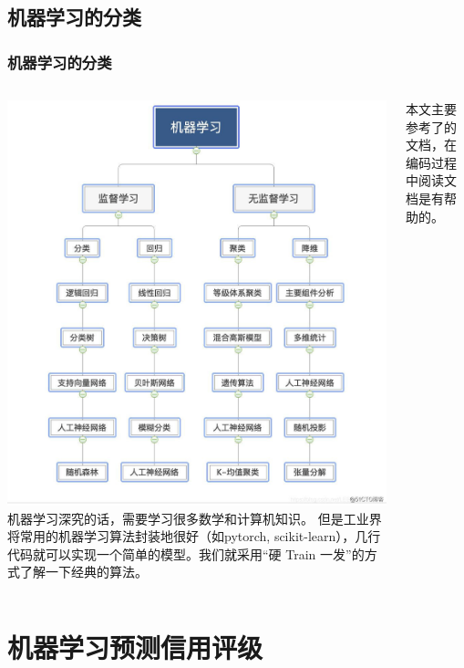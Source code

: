 \subsection{机器学习的分类}
\begin{frame}
    \frametitle{机器学习的分类}
    \begin{columns}
        \includegraphics[width=.9\textwidth]{../lib/机器学习.jpeg}
        机器学习深究的话，需要学习很多数学和计算机知识。
        但是工业界将常用的机器学习算法封装地很好（如pytorch, scikit-learn），几行代码就可以实现一个简单的模型。我们就采用“硬 Train 一发”的方式了解一下经典的算法。

        本文主要参考了\textcite{scikit-learn}的文档，在编码过程中阅读文档是有帮助的。
    \end{columns}
\end{frame}
\section{机器学习预测信用评级}
